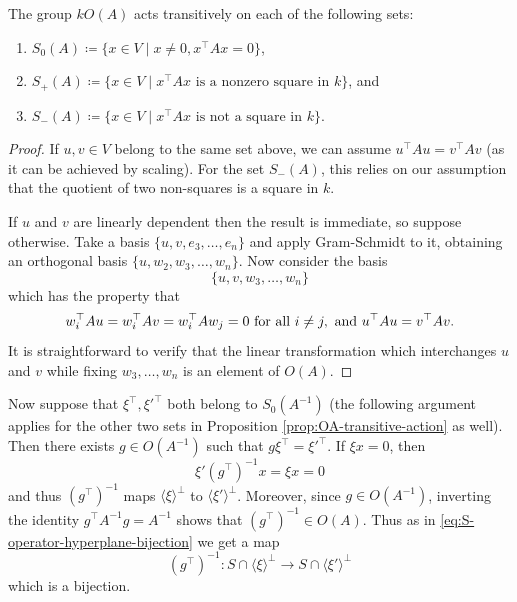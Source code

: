 \begin{prop}\label{prop:OA-transitive-action}
	The group $kO(A)$ acts transitively on each of the following sets:
	\begin{enumerate}
		\item $S_0(A) \coloneqq \{x \in V \mid x\neq 0, x^\top A x = 0\}$,
		\item $S_+(A) \coloneqq \{ x\in V \mid x^\top A x \text{ is a nonzero square in } k\}$, and
		\item $S_-(A) \coloneqq \{ x\in V \mid x^\top A x \text{ is not a square in } k\}$.
	\end{enumerate}
\end{prop}
\begin{proof}
	If $u,v\in V$ belong to the same set above, we can assume $u^\top A u = v^\top A v$ (as it can be achieved by scaling). For the set $S_-(A)$, this relies on our assumption that the quotient of two non-squares is a square in $k$.
	
	If $u$ and $v$ are linearly dependent then the result is immediate, so suppose otherwise. Take a basis $\{u,v,e_3,\ldots,e_n\}$ and apply Gram-Schmidt to it, obtaining an orthogonal basis $\{u, w_2, w_3, \ldots,w_n\}$. Now consider the basis
	\[
		\{u,v,w_3,\ldots,w_n\}
	\]
	which has the property that
	\[
		w_i^\top A u = w_i^\top A v = w_i^\top A w_j = 0 \text{ for all } i \neq j, \text{ and }\\
		u^\top A u = v^\top A v.
	\]
	It is straightforward to verify that the linear transformation which interchanges $u$ and $v$ while fixing $w_3,\ldots,w_n$ is an element of $O(A)$.
\end{proof}


Now suppose that $\xi^\top,\xi'^\top$ both belong to $S_0(A^{-1})$ (the following argument applies for the other two sets in Proposition \ref{prop:OA-transitive-action} as well). Then there exists $g \in O(A^{-1})$ such that $g \xi^\top = \xi'^\top$. If $\xi x = 0$, then
\[
	\xi' (g^\top)^{-1} x = \xi x = 0
\]
and thus $(g^\top)^{-1}$ maps $\langle \xi \rangle^\bot$ to $\langle \xi' \rangle^\bot$. Moreover, since $g \in O(A^{-1})$, inverting the identity $g^\top A^{-1} g = A^{-1}$ shows that $(g^\top)^{-1} \in O(A)$. Thus as in \eqref{eq:S-operator-hyperplane-bijection} we get a map
\[
	(g^\top)^{-1} \colon S \cap \langle \xi \rangle^\bot \to S \cap \langle \xi' \rangle^\bot
\]
which is a bijection.

